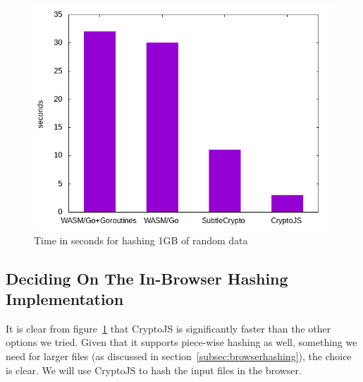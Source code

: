 \begin{figure}
    \begin{center}
        \includegraphics[width=0.7\linewidth]{images/hashingperformance.png}
        \caption{Time in seconds for hashing 1GB of random data}
        \label{fig:hashingperformance}
    \end{center}
\end{figure}


\subsection{Deciding On The In-Browser Hashing Implementation}
\label{subsec:deciding-on-the-in-browser-hashing-implementation}
It is clear from figure~\ref{fig:hashingperformance} that CryptoJS is significantly faster than the other options we tried.
Given that it supports piece-wise hashing as well,
something we need for larger files (as discussed in section~\ref{subsec:browserhashing}), the choice is clear.
We will use CryptoJS to hash the input files in the browser.













